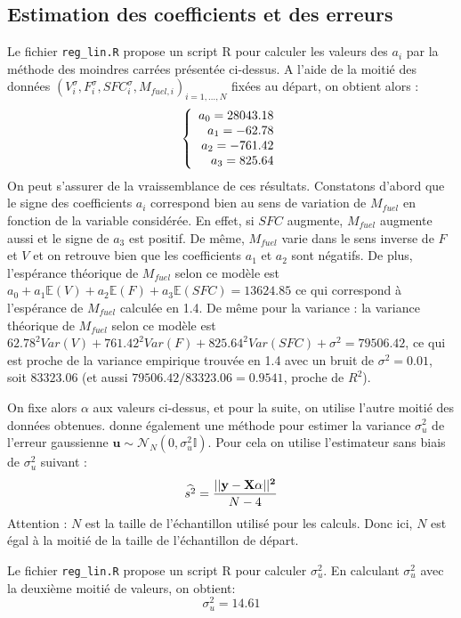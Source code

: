 \documentclass{article}
\begin{document}
\subsection{Estimation des coefficients et des erreurs}
Le fichier \texttt{reg\_lin.R} propose un script R pour calculer les valeurs des $a_{i}$ par la méthode des moindres carrées présentée ci-dessus. A l'aide de la moitié des données $(V_{i}^{\sigma},F_{i}^{\sigma},SFC_{i}^{\sigma}, M_{fuel,i})_{i=1,...,N}$ fixées au départ, on obtient alors :
\[
\left\{
\begin{array}{r c l}
a_{0}=28043.18\\
a_{1}=-62.78\\
a_{2}=-761.42\\
a_{3}=825.64
\end{array}
\right.
\]
On peut s'assurer de la vraissemblance de ces résultats. Constatons d'abord que le signe des coefficients $a_i$ correspond bien au sens de variation de $M_{fuel}$ en fonction de la variable considérée. En effet, si $SFC$ augmente, $M_{fuel}$ augmente aussi et le signe de $a_3$ est positif. De même, $M_{fuel}$ varie dans le sens inverse de $F$ et $V$ et on retrouve bien que les coefficients $a_1$ et $a_2$ sont négatifs. De plus, l'espérance théorique de $M_{fuel}$ selon ce modèle est $a_0+a_1\mathbb{E}(V)+a_2\mathbb{E}(F)+a_3\mathbb{E}(SFC)=13624.85$ ce qui correspond à l'espérance de $M_{fuel}$ calculée en 1.4. De même pour la variance : la variance théorique de $M_{fuel}$ selon ce modèle est $62.78^{2}Var(V)+761.42^{2}Var(F)+825.64^{2}Var(SFC)+\sigma^{2}=79506.42$, ce qui est proche de la variance empirique trouvée en 1.4 avec un bruit de $\sigma^{2}=0.01$, soit $83323.06$ (et aussi $79506.42/83323.06 = 0.9541$, proche de $R^{2}$).

\medbreak
On fixe alors $\alpha$ aux valeurs ci-dessus, et pour la suite, on utilise l'autre moitié des données obtenues.
\medbreak
\cite{ref1} donne également une méthode pour estimer la variance $\sigma_{u}^{2}$ de l'erreur gaussienne $\textbf{u}\sim\mathcal{N}_{N}(0,\sigma_{u}^{2}\mathbb{I})$. Pour cela on utilise l'estimateur sans biais de $\sigma_{u}^{2}$ suivant :
\[\widehat{s^{2}}=\frac{||\bf{y-X\alpha}||^{2}}{N-4}\]
Attention : $N$ est la taille de l'échantillon utilisé pour les calculs. Donc ici, $N$ est égal à la moitié de la taille de l'échantillon de départ.

Le fichier \texttt{reg\_lin.R} propose un script R pour calculer $\sigma_{u}^{2}$. En calculant $\sigma_{u}^{2}$ avec la deuxième moitié de valeurs, on obtient:
\[\sigma_{u}^{2}=14.61\]
\end{document}
